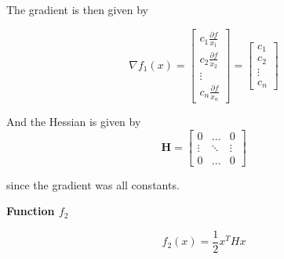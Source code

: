 The gradient is then given by

\[
\nabla f_1(x) = 
\begin{bmatrix}
	c_1 \frac{\partial f}{x_1} \\ 
	c_2 \frac{\partial f}{x_2} \\ 
	\vdots \\ 
	c_n \frac{\partial f}{x_n}
\end{bmatrix}
=
\begin{bmatrix}
	c_1 \\ 
	c_2\\ 
	\vdots \\ 
	c_n 
\end{bmatrix}
\]

And the Hessian is given by 
\[
\textbf{H} = 
\begin{bmatrix}
0 & \ldots & 0 \\
\vdots & \ddots & \vdots \\
0 & \ldots & 0
\end{bmatrix}
\]

since the gradient was all constants.

\textbf{Function $f_2$}


\[
f_2(x) = \frac{1}{2} x^T H x
\]











